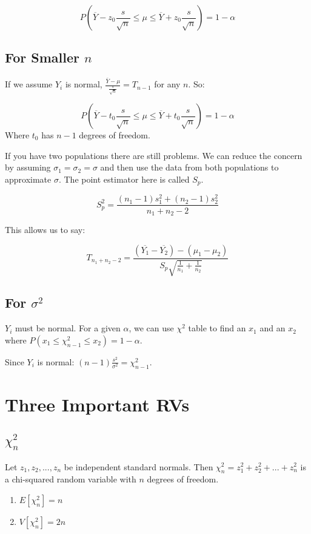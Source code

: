 \documentclass{article}
\begin{document}
\begin{equation}
  P(\overline{Y}-z_0 \frac{s}{\sqrt{n}} \leq \mu \leq \overline{Y} 
    + z_0\frac{s}{\sqrt{n}}) = 1- \alpha
\end{equation}

\subsection{For Smaller $n$}
If we assume $Y_i$ is normal,
$\frac{\overline{Y} - \mu}{\frac{s}{\sqrt{n}}} = T_{n-1}$ for any $n$. So:

\begin{equation}
  P(\overline{Y} - t_0\frac{s}{\sqrt{n}} \leq \mu \leq \overline{Y} +
    t_0\frac{s}{\sqrt{n}}) = 1 - \alpha
\end{equation}
Where $t_0$ has $n-1$ degrees of freedom.

If you have two populations there are still problems. We can reduce the concern
by assuming $\sigma_1=\sigma_2=\sigma$ and then use the data from both
populations to approximate $\sigma$. The point estimator here is called $S_p$.

\begin{equation}
  S_p^2=\frac{(n_1 -1)s_1^2+(n_2 - 1)s_2^2}{n_1+n_2-2}
\end{equation}

This allows us to say:

\begin{equation}
  T_{n_1+n_2-2} = \frac{(\overline{Y_1} - \overline{Y_2})
    - (\mu_1 - \mu_2)}{S_p\sqrt{\frac{1}{n_1} + \frac{1}{n_2}}}
\end{equation}

\subsection{For $\sigma^2$}
$Y_i$ must be normal. For a given $\alpha$, we can use $\chi^2$ table to find
an $x_1$ and an $x_2$ where $P(x_1 \leq \chi_{n-1}^2 \leq x_2)=1-\alpha$.

Since $Y_i$ is normal: $(n-1)\frac{s^2}{\sigma^2}=\chi_{n-1}^{2}$.


\section{Three Important RVs}
\subsection{$\chi^2_n$}
Let $z_1,z_2,...,z_n$ be independent standard normals. Then
$\chi^2_n=z_1^2+z_2^2+...+z_n^2$ is a chi-squared random variable with $n$
degrees of freedom.
\begin{enumerate}
  \item $E[\chi^2_n]=n$
  \item $V[\chi^2_n]=2n$
\end{enumerate}
\end{document}
